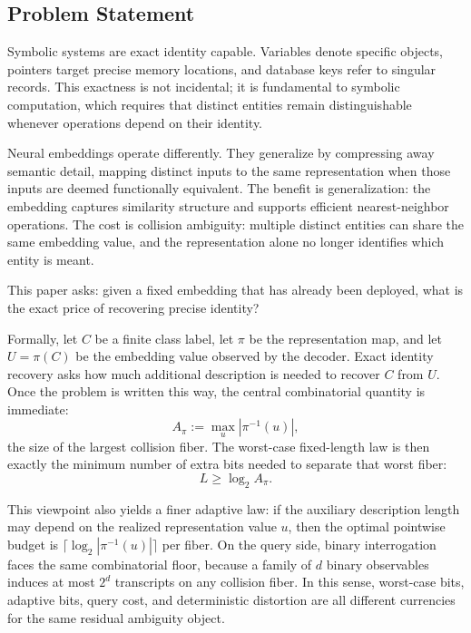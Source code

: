 \subsection{Problem Statement}

Symbolic systems are exact identity capable. Variables denote specific objects, pointers target precise memory locations, and database keys refer to singular records. This exactness is not incidental; it is fundamental to symbolic computation, which requires that distinct entities remain distinguishable whenever operations depend on their identity.

Neural embeddings operate differently. They generalize by compressing away semantic detail, mapping distinct inputs to the same representation when those inputs are deemed functionally equivalent. The benefit is generalization: the embedding captures similarity structure and supports efficient nearest-neighbor operations. The cost is collision ambiguity: multiple distinct entities can share the same embedding value, and the representation alone no longer identifies which entity is meant.

This paper asks: given a fixed embedding that has already been deployed, what is the exact price of recovering precise identity?

Formally, let $C$ be a finite class label, let $\pi$ be the representation map, and let $U = \pi(C)$ be the embedding value observed by the decoder. Exact identity recovery asks how much additional description is needed to recover $C$ from $U$. Once the problem is written this way, the central combinatorial quantity is immediate:
\[
A_{\pi} := \max_u |\pi^{-1}(u)|,
\]
the size of the largest collision fiber. The worst-case fixed-length law is then exactly the minimum number of extra bits needed to separate that worst fiber:
\[
L \ge \log_2 A_{\pi}.
\]

This viewpoint also yields a finer adaptive law: if the auxiliary description length may depend on the realized representation value $u$, then the optimal pointwise budget is $\lceil \log_2 |\pi^{-1}(u)|\rceil$ per fiber. On the query side, binary interrogation faces the same combinatorial floor, because a family of $d$ binary observables induces at most $2^d$ transcripts on any collision fiber. In this sense, worst-case bits, adaptive bits, query cost, and deterministic distortion are all different currencies for the same residual ambiguity object.

